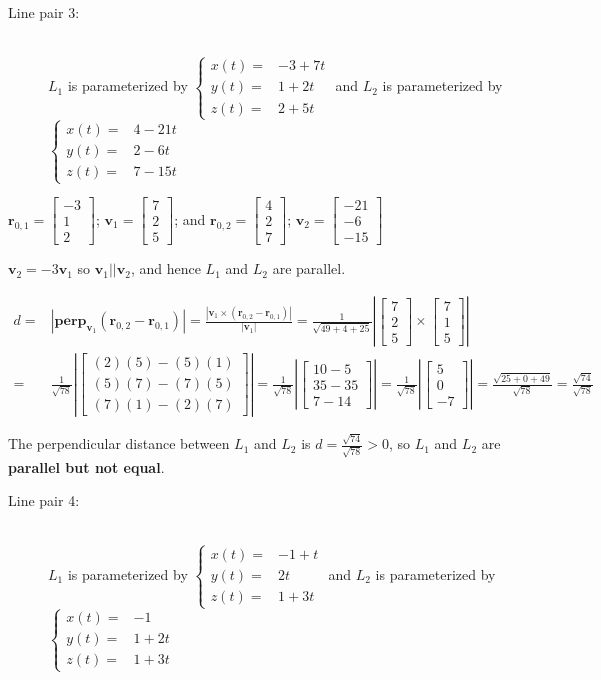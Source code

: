 \documentclass{article}
\newcommand{\abs}[1]{\left|#1\right|}
\newcommand{\colvec}[3]{\begin{bmatrix} #1 \\ #2 \\ #3 \end{bmatrix}}
\newcommand{\dr}[1]{\textcolor{dark_red}{#1}}
\begin{document}
\begin{description}
\item[Line pair 3:] ~ \\
\(L_1\) is parameterized by \(\left\{\begin{array}{rl} x(t) = & -3 + 7t \\ y(t) = & 1 + 2t \\ z(t) = & 2 + 5t \end{array}\right.\) and
\(L_2\) is parameterized by \(\left\{\begin{array}{rl} x(t) = & 4 - 21t \\ y(t) = & 2 - 6t \\ z(t) = & 7 - 15t \end{array}\right.\)
\end{description}

\dr{\(\mathbf{r}_{0,1} = \colvec{-3}{1}{2}\); \(\mathbf{v}_1 = \colvec{7}{2}{5}\); and \(\mathbf{r}_{0,2} = \colvec{4}{2}{7}\); \(\mathbf{v}_2 = \colvec{-21}{-6}{-15}\)}

\dr{\(\mathbf{v}_2 = -3\mathbf{v}_1\) so \(\mathbf{v}_1 || \mathbf{v}_2\), and hence \(L_1\) and \(L_2\) are parallel.}

\dr{\begin{align*}
d = & \abs{\textbf{perp}_{\mathbf{v}_1}(\mathbf{r}_{0,2} - \mathbf{r}_{0,1})} 
= \frac{\abs{\mathbf{v}_1 \times (\mathbf{r}_{0,2} - \mathbf{r}_{0,1})}}{\abs{\mathbf{v}_1}} 
= \frac{1}{\sqrt{49 + 4 + 25}}\abs{\colvec{7}{2}{5} \times \colvec{7}{1}{5}} \\
= & \frac{1}{\sqrt{78}}\abs{\colvec{(2)(5) - (5)(1)}{(5)(7) - (7)(5)}{(7)(1) - (2)(7)}} 
= \frac{1}{\sqrt{78}}\abs{\colvec{10 - 5}{35 - 35}{7 - 14}}  
= \frac{1}{\sqrt{78}}\abs{\colvec{5}{0}{-7}} 
= \frac{\sqrt{25 + 0 + 49}}{\sqrt{78}} 
= \frac{\sqrt{74}}{\sqrt{78}}
\end{align*}}

\dr{The perpendicular distance between \(L_1\) and \(L_2\) is \(d = \frac{\sqrt{74}}{\sqrt{78}} > 0\), so \(L_1\) and \(L_2\) are \textbf{parallel but not equal}.}


\begin{description}
\item[Line pair 4:] ~ \\
\(L_1\) is parameterized by \(\left\{\begin{array}{rl} x(t) = & -1 + t \\ y(t) = & 2t \\ z(t) = & 1 + 3t \end{array}\right.\) and
\(L_2\) is parameterized by \(\left\{\begin{array}{rl} x(t) = & -1 \\ y(t) = & 1 + 2t \\ z(t) = & 1 + 3t \end{array}\right.\)
\end{description}
\end{document}

